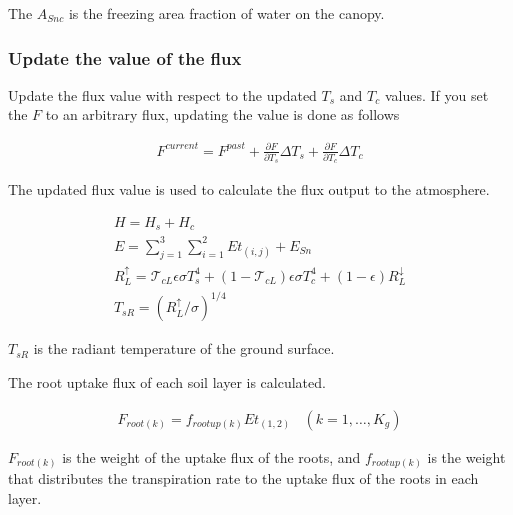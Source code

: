 The \(A_{Snc}\) is the freezing area fraction of water on the canopy.

\hypertarget{update-the-value-of-the-flux}{%
\subsubsection{Update the value of the
flux}\label{update-the-value-of-the-flux}}

Update the flux value with respect to the updated \(T_s\) and \(T_c\)
values. If you set the \(F\) to an arbitrary flux, updating the value is
done as follows

\begin{eqnarray}
 F^{current} = F^{past} + \frac{\partial F}{\partial T_s} \Delta T_s
                        + \frac{\partial F}{\partial T_c} \Delta T_c
\end{eqnarray}

The updated flux value is used to calculate the flux output to the
atmosphere.

\begin{eqnarray}
 H = H_s + H_c \\
 E = \sum_{j=1}^3 \sum_{i=1}^2 Et_{(i,j)} + E_{Sn} \\
 R^{\uparrow}_L = {\mathcal{T}}_{cL} \epsilon \sigma T_s^4
 + (1 - {\mathcal{T}}_{cL}) \epsilon \sigma T_c^4
 + (1 - \epsilon) R^{\downarrow}_L \\
 T_{sR} = ( R^{\uparrow}_L / \sigma )^{1/4}
\end{eqnarray}

\(T_{sR}\) is the radiant temperature of the ground surface.

The root uptake flux of each soil layer is calculated.

\begin{eqnarray}
 F_{root(k)} = f_{rootup(k)} Et_{(1,2)} \ \ \ \ (k=1,\ldots,K_g)
\end{eqnarray}

\(F_{root(k)}\) is the weight of the uptake flux of the roots, and
\(f_{rootup(k)}\) is the weight that distributes the transpiration rate
to the uptake flux of the roots in each layer.
